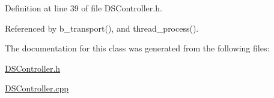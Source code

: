 Definition at line 39 of file D\+S\+Controller.\+h.



Referenced by b\+\_\+transport(), and thread\+\_\+process().



The documentation for this class was generated from the following files\+:\begin{DoxyCompactItemize}
\item 
\hyperlink{DSController_8h}{D\+S\+Controller.\+h}\item 
\hyperlink{DSController_8cpp}{D\+S\+Controller.\+cpp}\end{DoxyCompactItemize}

